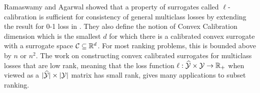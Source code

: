Ramaswamy and Agarwal \cite{ramaswamy2016convex} showed that a property of surrogates called $\ell$-calibration is sufficient for consistency of general multiclass losses by extending the result for 0-1 loss in \cite{tewari2007consistency}. They also define the notion of Convex Calibration dimension which is the smallest $d$ for which there is a calibrated convex surrogate with a surrogate space ${\mathcal C} \subseteq {\mathbb R}^d$. For most ranking problems, this is bounded above by $n$ or $n^2$.  The work \cite{ramaswamy2013convex} on constructing convex calibrated surrogates for multiclass losses that are low rank, meaning that the loss function $\ell:\widehat{\mathcal{Y}} \times {\mathcal Y} \to {\mathbb R}_+$ when viewed as a $|\widehat{\mathcal{Y}}|\times|{\mathcal Y}|$ matrix has small rank, gives many applications to subset ranking. 

% 
